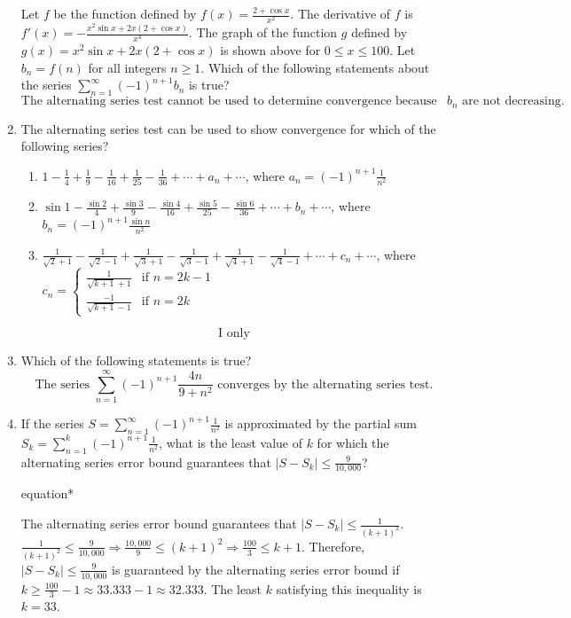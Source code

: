 \documentclass[12pt]{article}
\begin{document}
\begin{enumerate}
\begin{center}
    \end{center}
    Let $f$ be the function defined by $f(x)= \frac{2+\cos x}{x^2}$. The derivative of $f$ is $f'(x) = -\frac{x^2\sin x+ 2x(2+\cos x)}{x^4}$. The graph of the function $g$ defined by $g(x)=x^2\sin x+2x(2+\cos x)$ is shown above for $0 \leq x \leq 100$. Let $b_n=f(n)$ for all integers $n\geq 1$. Which of the following statements about the series $\sum_{n=1}^{\infty} (-1)^{n+1}b_n$ is true?
	$$\text{The alternating series test cannot be used to determine convergence because the terms $b_n$ are not decreasing.}$$
    \item The alternating series test can be used to show convergence for which of the following series?
    \begin{enumerate}[label=\Roman*.]
        \item $1-\frac{1}{4}+\frac{1}{9}-\frac{1}{16} +\frac{1}{25} - \frac{1}{36} + \cdots + a_n + \cdots$, where $a_n = (-1)^{n+1}\frac{1}{n^2}$
        \item $\sin 1 - \frac{\sin 2}{4} + \frac{\sin 3}{9} - \frac{\sin 4}{16} + \frac{\sin 5}{25} - \frac{\sin 6}{36} + \cdots + b_n + \cdots$, where $b_n = (-1)^{n+1} \frac{\sin n}{n^2}$
        \item $\frac{1}{\sqrt{2}+1} - \frac{1}{\sqrt{2} - 1} + \frac{1}{\sqrt{3}+1} - \frac{1}{\sqrt{3}-1} + \frac{1}{\sqrt{4}+1} - \frac{1}{\sqrt{4} - 1} + \cdots + c_n + \cdots$, where $c_n = \left\{ \begin{matrix}
            \frac{1}{\sqrt{k+1}+1} & \text{if } n = 2k-1 \\ \frac{-1}{\sqrt{k+1}-1} & \text{if } n = 2k \end{matrix}\right.\,$
    \end{enumerate}
	$$\boxed{\text{I only}}$$
    \item Which of the following statements is true?
    $$\boxed{\text{The series $\sum_{n=1}^{\infty} (-1)^{n+1} \frac{4n}{9+n^2}$ converges by the alternating series test.}}$$
    \item If the series $S = \sum_{n=1}^{\infty} (-1)^{n+1} \frac{1}{n^2}$ is approximated by the partial sum $S_k = \sum_{n=1}^{k} (-1)^{n+1} \frac{1}{n^2}$, what is the least value of $k$ for which the alternating series error bound guarantees that $|S-S_k| \leq \frac{9}{10,000}$?
	\begin{empheq}[box=\tcbhighmath]{equation*}
		\parbox{6in}{The alternating series error bound guarantees that $|S-S_k|\leq \frac{1}{(k+1)^2}$. $\frac{1}{(k+1)^2} \leq \frac{9}{10,000} \Longrightarrow \frac{10,000}{9} \leq (k+1)^2 \Longrightarrow \frac{100}{3} \leq k+1$. Therefore, $|S-S_k| \leq \frac{9}{10,000}$ is guaranteed by the alternating series error bound if $k\geq \frac{100}{3}-1 \approx 33.333 - 1 \approx 32.333$. The least $k$ satisfying this inequality is $k=33$.}

\end{empheq}
\end{enumerate}
\end{document}
